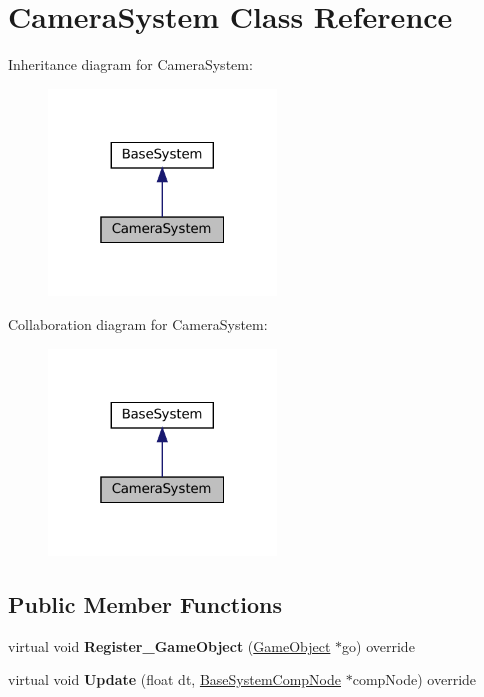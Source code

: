 \hypertarget{classCameraSystem}{}\section{Camera\+System Class Reference}
\label{classCameraSystem}


Inheritance diagram for Camera\+System\+:\nopagebreak
\begin{figure}[H]
\begin{center}
\leavevmode
\includegraphics[width=172pt]{classCameraSystem__inherit__graph}
\end{center}
\end{figure}


Collaboration diagram for Camera\+System\+:\nopagebreak
\begin{figure}[H]
\begin{center}
\leavevmode
\includegraphics[width=172pt]{classCameraSystem__coll__graph}
\end{center}
\end{figure}
\subsection*{Public Member Functions}
\begin{DoxyCompactItemize}
\item 
\mbox{\label{classCameraSystem_a2cbe7b251450e9693cf49759fba120e6}} 
virtual void {\bfseries Register\+\_\+\+Game\+Object} (\hyperlink{classGameObject}{Game\+Object} $\ast$go) override
\item 
\mbox{\label{classCameraSystem_ab0ea25c2a8f704f0a0674a3bc61ddd68}} 
virtual void {\bfseries Update} (float dt, \hyperlink{structBaseSystemCompNode}{Base\+System\+Comp\+Node} $\ast$comp\+Node) override
\end{DoxyCompactItemize}
